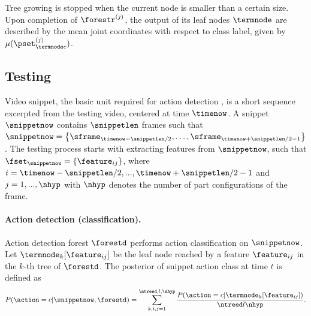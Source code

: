 Tree growing is stopped when the current node is smaller than a certain size.
Upon completion of $\forestr^{(j)}$, the output of its leaf nodes $\termnode$ are described by the mean joint coordinates with respect to class label, given by $\mu(\pset^{(j)}_{\termnode c})$.  



\subsection{Testing}

Video snippet, the basic unit required for action detection \cite{Schindler2008}, is a short sequence excerpted from the testing video, centered at time $\timenow$. A snippet $\snippetnow$ contains $\snippetlen$ frames such that $\snippetnow = \left\{ \sframe_{\timenow - \snippetlen/2}, \dots, \sframe_{\timenow + \snippetlen/2 - 1} \right\}$. The testing process starts with extracting features from $\snippetnow$, such that $\fset_{\snippetnow} = \{ \feature_{ij}\}$, where $i =\timenow-\snippetlen/2,...,\timenow+\snippetlen/2-1$ and $j=1,...,\nhyp$ with $\nhyp$ denotes the number of part configurations of the frame.
\paragraph{Action detection (classification).} 
\label{sec:adftest}
Action detection forest $\forestd$ performs action classification on $\snippetnow$. Let $\termnode_k[\feature_{ij}]$ be the leaf node reached by a feature $\feature_{ij}$ in the $k$-th tree of $\forestd$. The posterior of snippet action class at time $t$ is defined as 
\begin{equation}
	P(\action = c | \snippetnow, \forestd) = \sum_{k,i,j = 1}^{\ntreed, l, \nhyp}\frac {P(\action=c|\termnode_{k}[\feature_{ij}])} {\ntreed l \nhyp}. 
\end{equation} 
